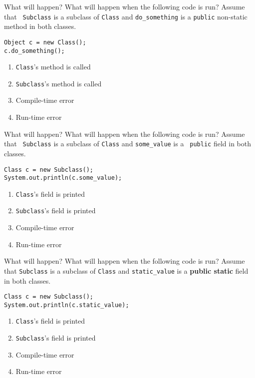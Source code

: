 \documentclass[9pt]{beamer}
\begin{document}
\begin{frame}[fragile]{What will happen?}
  What will happen when the following code is run? Assume that {\tt
  Subclass} is a subclass of {\tt Class} and {\tt do\_something} is a
  {\tt public} non-static method in both classes.
  \begin{lstlisting}
Object c = new Class();
c.do_something();
  \end{lstlisting}
  \begin{enumerate}
    \item
      {\tt Class}'s method is called
    \item
      {\tt Subclass}'s method is called
    \item
      \alert<2>{Compile-time error}
    \item
      Run-time error
  \end{enumerate}
\end{frame}

\begin{frame}[fragile]{What will happen?}
  What will happen when the following code is run? Assume that {\tt
  Subclass} is a subclass of {\tt Class} and {\tt some\_value} is a {\tt
  public} field in both classes.
  \begin{lstlisting}
Class c = new Subclass();
System.out.println(c.some_value);
  \end{lstlisting}
  \begin{enumerate}
    \item
      \alert<2>{{\tt Class}'s field is printed}
    \item
      {\tt Subclass}'s field is printed
    \item
      Compile-time error
    \item
      Run-time error
  \end{enumerate}
\end{frame}

\begin{frame}[fragile]{What will happen?}
  What will happen when the following code is run? Assume that {\tt Subclass} is
  a subclass of {\tt Class} and {\tt static\_value} is a {\bf public static}
  field in both classes.
  \begin{lstlisting}
Class c = new Subclass();
System.out.println(c.static_value);
  \end{lstlisting}
  \begin{enumerate}
    \item
      \alert<2>{{\tt Class}'s field is printed}
    \item
      {\tt Subclass}'s field is printed
    \item
      Compile-time error
    \item
      Run-time error
  \end{enumerate}
\end{frame}
\end{document}
